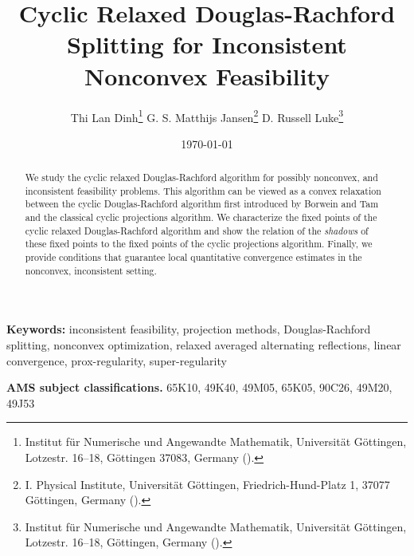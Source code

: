 \documentclass[12pt]{article}
\title{Cyclic Relaxed Douglas-Rachford Splitting for Inconsistent Nonconvex Feasibility}
\author{
 \begin{minipage}{\textwidth}
   \centering
   Thi Lan Dinh\thanks{Institut f\"ur Numerische und Angewandte Mathematik, Universit\"at G\"{o}ttingen, Lotzestr. 16--18, G\"ottingen 37083, Germany (\email{t.dinh@math.uni-goettingen.de}).} \quad
   G. S. Matthijs Jansen\thanks{I. Physical Institute, Universit\"at G\"ottingen, Friedrich-Hund-Platz 1,  37077 G\"{o}ttingen, Germany (\email{gsmjansen@uni-goettingen.de}).} \quad
   D. Russell Luke\thanks{Institut f\"ur Numerische und Angewandte Mathematik, Universit\"at G\"ottingen, Lotzestr. 16--18, G\"{o}ttingen, Germany (\email{r.luke@math.uni-goettingen.de}).}
 \end{minipage}
}
\date{\today}
\newenvironment{keywords}{\begin{center}\textbf{Keywords: }}{\end{center}}
\theoremstyle{definition}
\begin{document}
\maketitle

\begin{abstract}
We study the cyclic relaxed Douglas-Rachford algorithm for possibly nonconvex, and inconsistent feasibility problems.
This algorithm can be viewed as a convex relaxation between the cyclic Douglas-Rachford algorithm first introduced
by Borwein and Tam \cite{BorTam14} and the classical cyclic projections algorithm.  %
We characterize the
fixed points of the cyclic relaxed Douglas-Rachford algorithm and show the relation of the {\em shadows} of
these fixed points to the fixed points of the cyclic projections algorithm.  Finally, we provide conditions that
guarantee local quantitative convergence estimates in the nonconvex, inconsistent setting.
\end{abstract}
\noindent\begin{keywords}
{inconsistent feasibility, projection methods, Douglas-Rachford splitting, nonconvex optimization, relaxed averaged alternating reflections, linear convergence, prox-regularity, super-regularity}
\end{keywords}


\noindent  \textbf{AMS subject classifications.} 65K10, 49K40, 49M05, 65K05, 90C26, 49M20, 49J53

%
%
%
\end{document}
